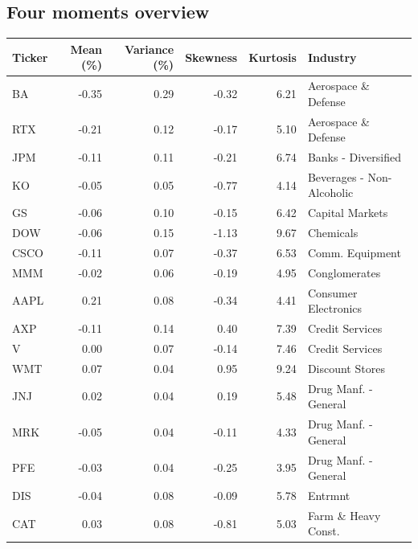 \documentclass[a4paper,12pt]{article}
\begin{document}
\subsection{Four moments overview \label{moments}}
\begin{table}[h!]
\centering
\raggedleft
\renewcommand{\arraystretch}{1} %
\setlength{\tabcolsep}{5pt} %
\begin{tabular}{|l|r|r|r|r|l|}
\hline
\textbf{Ticker} & \textbf{Mean (\%)} & \textbf{Variance (\%)} & \textbf{Skewness} & \textbf{Kurtosis} & \textbf{Industry} \\ \hline
BA   & -0.35 & 0.29 & -0.32 & 6.21  & Aerospace \& Defense            \\ \hline
RTX  & -0.21 & 0.12 & -0.17 & 5.10  & Aerospace \& Defense            \\ \hline
JPM  & -0.11 & 0.11 & -0.21 & 6.74  & Banks - Diversified             \\ \hline
KO   & -0.05 & 0.05 & -0.77 & 4.14  & Beverages - Non-Alcoholic       \\ \hline
GS   & -0.06 & 0.10 & -0.15 & 6.42  & Capital Markets                 \\ \hline
DOW  & -0.06 & 0.15 & -1.13 & 9.67  & Chemicals                       \\ \hline
CSCO & -0.11 & 0.07 & -0.37 & 6.53  & Comm. Equipment         \\ \hline
MMM  & -0.02 & 0.06 & -0.19 & 4.95  & Conglomerates                   \\ \hline
AAPL & 0.21  & 0.08 & -0.34 & 4.41  & Consumer Electronics            \\ \hline
AXP  & -0.11 & 0.14 & 0.40  & 7.39  & Credit Services                 \\ \hline
V    & 0.00  & 0.07 & -0.14 & 7.46  & Credit Services                 \\ \hline
WMT  & 0.07  & 0.04 & 0.95  & 9.24  & Discount Stores                 \\ \hline
JNJ  & 0.02  & 0.04 & 0.19  & 5.48  & Drug Manf. - General    \\ \hline
MRK  & -0.05 & 0.04 & -0.11 & 4.33  & Drug Manf. - General    \\ \hline
PFE  & -0.03 & 0.04 & -0.25 & 3.95  & Drug Manf. - General    \\ \hline
DIS  & -0.04 & 0.08 & -0.09 & 5.78  & Entrmnt                   \\ \hline
CAT  & 0.03  & 0.08 & -0.81 & 5.03  & Farm \& Heavy Const. \\ \hline

\end{tabular}
\end{table}
\end{document}
